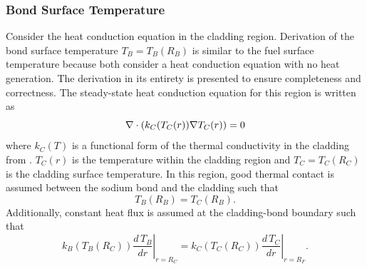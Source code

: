     \subsubsection{Bond Surface Temperature}
      Consider the heat conduction equation in the cladding region. Derivation
      of the bond surface temperature $T_B=T_B(R_B)$ is similar to
      the fuel surface temperature because both consider a heat conduction
      equation with no heat generation. The derivation in its entirety is
      presented to ensure completeness and correctness. The steady-state heat 
      conduction equation for this region is written as
      \begin{equation}
        \label{eq:clad_conduction_grad}
        \mathbf{\nabla} \cdot (k_C(T_C(r)) \mathbf{\nabla} T_C(r)) = 0
      \end{equation}
      where $k_C(T)$ is a functional form of the thermal conductivity in the
      cladding from \cite{ht9Prop}. $T_C(r)$ is the temperature within the
      cladding region and $T_C=T_C(R_C)$ is the cladding surface temperature. 
      In this region, good thermal contact is assumed between the sodium bond
      and the cladding such that
      \begin{equation}
        \label{eq:rb_temp_continuity}
        T_B(R_B)=T_C(R_B).
      \end{equation}
      Additionally, constant heat flux is assumed at the
      cladding-bond boundary such that
      \begin{equation}
        \label{eq:rb_flux_continuity}
        \left. k_B(T_B(R_C)) \frac{d\,T_B}{dr}\right|_{r=R_C} = 
          \left. k_C(T_C(R_C)) \frac{d\,T_C}{dr}\right|_{r=R_F}.
      \end{equation}


